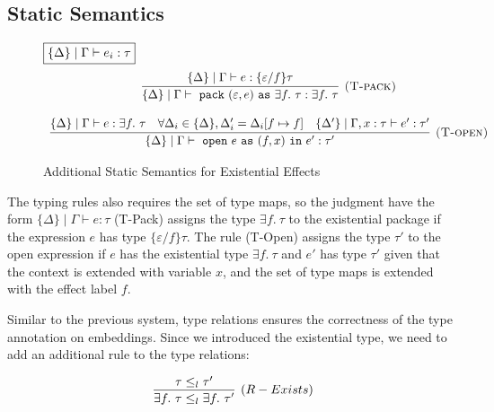 \subsection{Static Semantics}
\begin{figure}[t]
\footnotesize{
\noindent$\fbox{$\{\Delta\} \mid \Gamma  \vdash e_i : \tau$}$
\[
\begin{array}{c}

\infer[\textsc{(T-pack)}]
  {\{\Delta\}\mid \Gamma \vdash \m{pack} (\varepsilon, e) \m{as} \exists f.\ \tau : \exists f.\ \tau}
  {\{\Delta\}\mid \Gamma \vdash e : \{\varepsilon / f\} \tau} \\[3ex]
  
\infer[\textsc{(T-open)}]
  {\{\Delta\}\mid \Gamma \vdash \m{open} e \m{as} (f, x) \m{in} e' : \tau'}
  {\{\Delta\}\mid \Gamma \vdash e : \exists f.\ \tau & \forall \Delta_i \in \{\Delta\}, \Delta'_i = \Delta_i[f\mapsto f] & \{\Delta'\}\mid \Gamma, x:\tau \vdash e' : \tau'}

\end{array}
\]
\caption{Additional Static Semantics for Existential Effects}
\label{static-addi}
}
\end{figure}

The typing rules also requires the set of type maps, so the judgment have the form $\{\Delta\} \mid \Gamma \vdash e : \tau$
(T-Pack) assigns the type $\exists f.\ \tau$ to the existential package if the expression $e$ has type $\{\varepsilon/f\}\tau$. The rule (T-Open) assigns the type $\tau'$ to the open expression if $e$ has the existential type $\exists f.\ \tau$ and $e'$ has type $\tau'$ given that the context is extended with variable $x$, and the set of type maps is extended with the effect label $f$. 

Similar to the previous system, type relations ensures the correctness of the type annotation on embeddings. Since we introduced the existential type, we need to add an additional rule to the type relations:

$$\infer[(R-Exists)]{\exists f.\ \tau \leq_l \exists f.\ \tau'}{\tau \leq_l \tau'}$$


